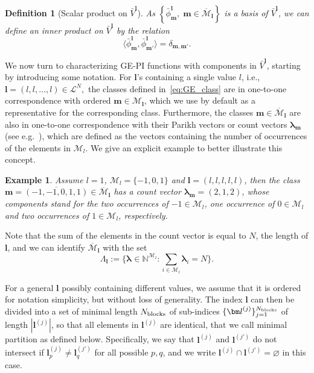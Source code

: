 \documentclass{article}
\newcommand{\blamb}[2]{\bm\lambda^{#1}_{#2}}
\newcommand{\bphi}[2]{\bar\phi^{#1}_{#2}}
\newcommand{\bV}{{\bar V}}
\newtheorem{definition}[theorem]{Definition}
\newtheorem{example}[theorem]{Example}
\numberwithin{equation}{section}
\def\N{\mathbb{N}}
\def\Nb{{N_{\rm blocks}}}
\def\bl{{\bm l}}
\def\bbm{{\bm m}}
\def\calM{\mathcal{M}}
\def\calL{\mathcal{L}}
\def\oMl{\overline{\calM}_\bl}
\def\Nat{{N}}
\begin{document}
{\begin{definition}[Scalar product on $\bV^\bl$]
    As $\left\{  \bphi{\bl}{\bbm},\; \bbm \in \oMl \right\}$ is a basis of $\bV^{\bl}$, we can define an inner product on $\bV^{\bl}$ by the relation
    \[
        \langle\bphi{\bl}{\bbm},\bphi{\bl}{\bbm'}\rangle=\delta_{\bbm,\bbm'}.
    \]
\end{definition}
We now turn to characterizing GE-PI functions with components in $\bV^\bl$, starting by introducing some notation.
For $\bl$'s containing a single value $l$, i.e., 
    $\bl = (l,l,\ldots,l)\in\calL^N,$
the classes defined in~\eqref{eq:GE_class} are in one-to-one correspondence with ordered $\bbm\in\calM_\bl$, which we use by default as a representative for the corresponding class. 
Furthermore, the classes $\bbm\in\oMl$ are also in one-to-one correspondence with their Parikh vectors or count vectors 
$\blamb{}{\bbm}$ (see e.g.~\cite[Supplementary lecture H]{Kozen2007-ot}), which are defined as the vectors containing the number of occurrences of the elements in $\calM_l$. 
We give an explicit example to better illustrate this concept.
\begin{example}
    Assume $l=1$, $\calM_l = \{-1,0,1\}$ and $\bl=(l,l,l,l,l)$, then the class $\bbm=\overline{(-1,-1,0,1,1)}\in\oMl$ has a count vector 
    $\blamb{}{\bbm}=(2,1,2)$, whose components stand for the two occurrences of $-1\in\calM_l$, one occurrence of $0\in\calM_l$ and two occurrences of $1\in\calM_l$, respectively. 
\end{example}

Note that the sum of the elements in the count vector is equal to $\Nat$, the length of $\bl$, and we can identify $\oMl$ with the set
\begin{equation}
\label{eq:lambda}
    \Lambda_{\bl} := 
    \{\blamb{}{}\in \N^{\calM_l}:\sum_{i\in\calM_l}\blamb{}{i} = \Nat\}.
\end{equation}

For a general $\bl$ possibly containing different values, we assume that it is ordered for notation simplicity, but without loss of generality. The index $\bl$ can then be divided into a set of minimal length $\Nb$ of sub-indices $\{\bl^{(j)}\}_{j=1}^\Nb$ of length $|\bl^{(j)}|$, so that all elements in $\bl^{(j)}$ are identical, that we call minimal partition as defined below. Specifically, we say that $\bl^{(j)}$ and $\bl^{(j')}$ do not intersect if $\bl^{(j)}_{p}\neq\bl^{(j')}_{q}$ for all possible $p,q$, and we write $\bl^{(j)} \cap \bl^{(j')} = \varnothing$ in this case.

}
\end{document}
